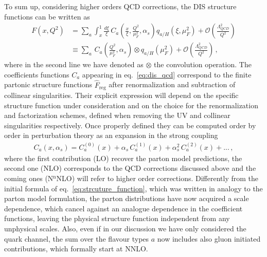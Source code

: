 %
To sum up, considering higher orders QCD corrections, the DIS structure functions can be written
as
\begin{align}
    \label{eq:dis_qcd}
    F\left(x,Q^2\right) &= 
    \sum_a \int_x^1\frac{d\xi}{\xi}\,C_a\left(\frac{x}{\xi},\frac{Q^2}{\mu_F^2}, \alpha_s\right)q_{a/H}\left(\xi,\mu_F^2\right)
    +\mathcal{O}\left(\frac{\Lambda_{QCD}^2}{Q^2}\right) \nonumber\\
    & \equiv \sum_a \,C_a\left(\frac{Q^2}{\mu_F^2}, \alpha_s\right) \otimes q_{a/H}\left(\mu_F^2\right)
    +\mathcal{O}\left(\frac{\Lambda_{QCD}^2}{Q^2}\right)\,,
\end{align}
where in the second line we have denoted as $\otimes$ the convolution operation.
The coefficients functions $C_a$ appearing in eq.~\eqref{eq:dis_qcd} correspond to the finite partonic structure 
functions $\hat{F}_{\text{reg}}$ after renormalization and subtraction of collinear singularities.
Their explicit expression will depend on the specific structure function under consideration
and on the choice for the renormalization and factorization schemes, defined when removing the UV and collinear
singularities respectively. 
Once properly defined they can be computed order by order in perturbation theory as an expansion in the strong coupling
\begin{align}
    \label{eq:coeff_functions_expansion}
    C_a\left(x, \alpha_s\right) = C_a^{(0)}\left(x\right) + \alpha_s\, C_a^{(1)}\left(x\right) 
    + \alpha_s^2\, C_a^{(2)}\left(x\right) + ...\,,
\end{align}
where the first contribution (LO) recover the parton model predictions, the second one (NLO) corresponds to the QCD
corrections discussed above and the coming ones (N$^{\text{n}}$NLO) will refer to higher order corrections.
Differently from the initial formula of eq.~\eqref{eq:strcuture_function}, which was written in analogy to
the parton model formulation, the parton distributions
have now acquired a scale dependence, which cancel against an analogue dependence in the coefficient functions,
leaving the physical structure function independent from any unphysical scales. Also, even if in our 
discussion we have only considered the quark channel, the sum over the flavour types $a$ now includes
also gluon initiated contributions, which formally start at NNLO.

